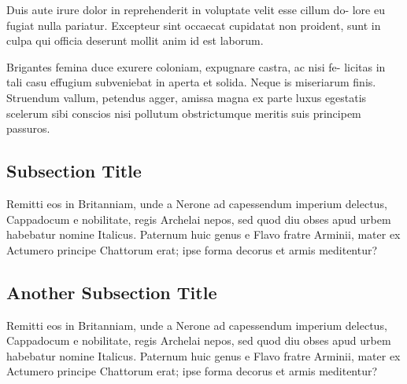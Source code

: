 Duis aute irure dolor in reprehenderit in voluptate velit esse cillum do- lore eu fugiat nulla pariatur. Excepteur sint occaecat cupidatat non proident, sunt in culpa qui officia deserunt mollit anim id est laborum.

Brigantes femina duce exurere coloniam, expugnare castra, ac nisi fe- licitas in tali casu effugium subveniebat in aperta et solida. Neque is miseriarum finis. Struendum vallum, petendus agger, amissa magna ex parte luxus egestatis scelerum sibi conscios nisi pollutum obstrictumque meritis suis principem passuros.

\subsection{Subsection Title}

Remitti eos in Britanniam, unde a Nerone ad capessendum imperium delectus, Cappadocum e nobilitate, regis Archelai nepos, sed quod diu obses apud urbem habebatur nomine Italicus. Paternum huic genus e Flavo fratre Arminii, mater ex Actumero principe Chattorum erat; ipse forma decorus et armis meditentur?

\subsection{Another Subsection Title}

Remitti eos in Britanniam, unde a Nerone ad capessendum imperium delectus, Cappadocum e nobilitate, regis Archelai nepos, sed quod diu obses apud urbem habebatur nomine Italicus. Paternum huic genus e Flavo fratre Arminii, mater ex Actumero principe Chattorum erat; ipse forma decorus et armis meditentur?


